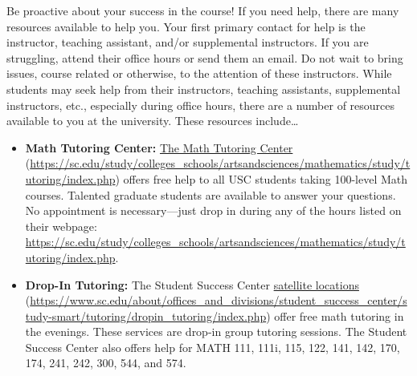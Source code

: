\documentclass[11pt,letterpaper]{article}
\begin{document}
Be proactive about your success in the course! If you need help, there are many resources available to help you. Your first primary contact for help is the instructor, teaching assistant, and/or supplemental instructors. If you are struggling, attend their office hours or send them an email. Do not wait to bring issues, course related or otherwise, to the attention of these instructors. While students may seek help from their instructors, teaching assistants, supplemental instructors, etc., especially during office hours, there are a number of resources available to you at the university. These resources include\dots
	\begin{itemize}
	\item {\bfseries Math Tutoring Center:} \href{https://sc.edu/study/colleges\_schools/artsandsciences/mathematics/study/tutoring/index.php}{The Math Tutoring Center} (\url{https://sc.edu/study/colleges\_schools/artsandsciences/mathematics/study/tutoring/index.php}) offers free help to all USC students taking 100-level Math courses. Talented graduate students are available to answer your questions. No appointment is necessary---just drop in during any of the hours listed on their webpage: \url{https://sc.edu/study/colleges\_schools/artsandsciences/mathematics/study/tutoring/index.php}. 
	
	\item {\bfseries Drop-In Tutoring:} The Student Success Center \href{https://www.sc.edu/about/offices\_and\_divisions/student\_success\_center/study-smart/tutoring/dropin\_tutoring/index.php}{satellite locations} (\url{https://www.sc.edu/about/offices\_and\_divisions/student\_success\_center/study-smart/tutoring/dropin\_tutoring/index.php}) offer free math tutoring in the evenings. These services are drop-in group tutoring sessions. The Student Success Center also offers help for MATH 111, 111i, 115, 122, 141, 142, 170, 174, 241, 242, 300, 544, and 574. 
	

\end{itemize}
\end{document}
